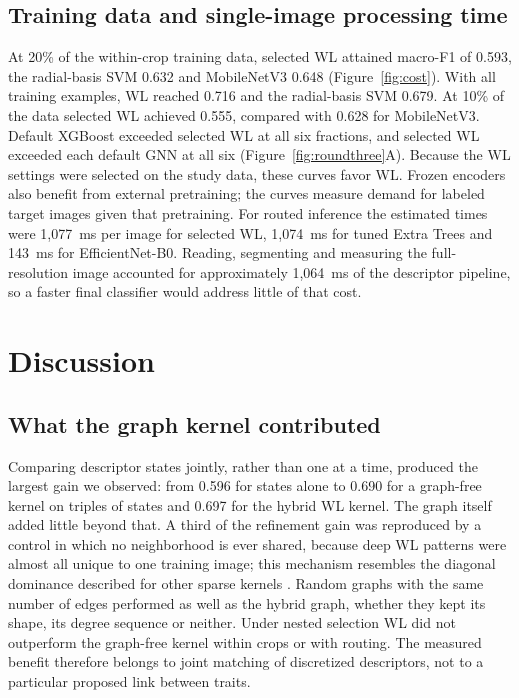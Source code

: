 \subsection{Training data and single-image processing time}
At 20\% of the within-crop training data, selected WL attained macro-F1 of 0.593, the radial-basis SVM 0.632 and MobileNetV3 0.648 (Figure~\ref{fig:cost}). With all training examples, WL reached 0.716 and the radial-basis SVM 0.679. At 10\% of the data selected WL achieved 0.555, compared with 0.628 for MobileNetV3. Default XGBoost exceeded selected WL at all six fractions, and selected WL exceeded each default GNN at all six (Figure~\ref{fig:roundthree}A). Because the WL settings were selected on the study data, these curves favor WL. Frozen encoders also benefit from external pretraining; the curves measure demand for labeled target images given that pretraining. For routed inference the estimated times were 1,077~ms per image for selected WL, 1,074~ms for tuned Extra Trees and 143~ms for EfficientNet-B0. Reading, segmenting and measuring the full-resolution image accounted for approximately 1,064~ms of the descriptor pipeline, so a faster final classifier would address little of that cost.
\showpanel{\costpanel}
\showpanel{\roundthreepanel}

\section{Discussion}
\subsection{What the graph kernel contributed}
Comparing descriptor states jointly, rather than one at a time, produced the largest gain we observed: from 0.596 for states alone to 0.690 for a graph-free kernel on triples of states and 0.697 for the hybrid WL kernel. The graph itself added little beyond that. A third of the refinement gain was reproduced by a control in which no neighborhood is ever shared, because deep WL patterns were almost all unique to one training image; this mechanism resembles the diagonal dominance described for other sparse kernels \citep{Yanardag2015,Greene2006}. Random graphs with the same number of edges performed as well as the hybrid graph, whether they kept its shape, its degree sequence or neither. Under nested selection WL did not outperform the graph-free kernel within crops or with routing. The measured benefit therefore belongs to joint matching of discretized descriptors, not to a particular proposed link between traits.

